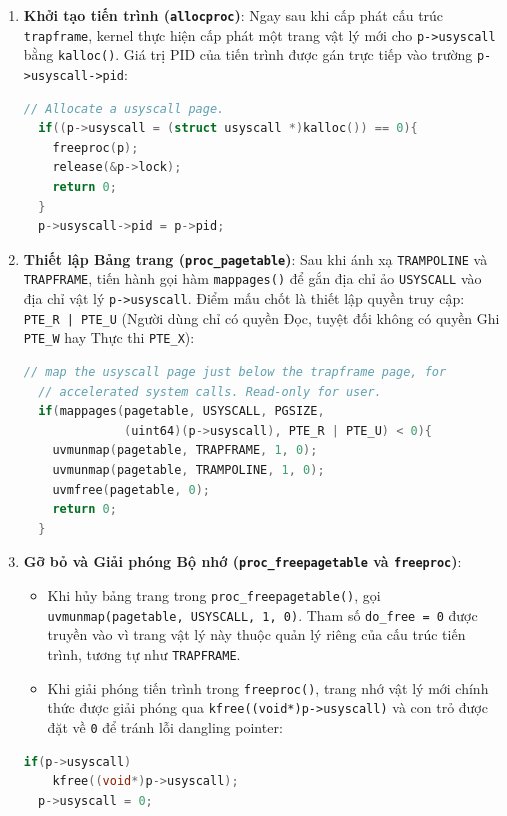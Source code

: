 \begin{enumerate}
    \item \textbf{Khởi tạo tiến trình (\texttt{allocproc})}: Ngay sau khi cấp phát cấu trúc \texttt{trapframe}, kernel thực hiện cấp phát một trang vật lý mới cho \texttt{p->usyscall} bằng \texttt{kalloc()}. Giá trị PID của tiến trình được gán trực tiếp vào trường \texttt{p->usyscall->pid}:
\begin{lstlisting}[language=C, caption={Cấp phát trang usyscall trong allocproc()}]
  // Allocate a usyscall page.
  if((p->usyscall = (struct usyscall *)kalloc()) == 0){
    freeproc(p);
    release(&p->lock);
    return 0;
  }
  p->usyscall->pid = p->pid;
\end{lstlisting}

    \item \textbf{Thiết lập Bảng trang (\texttt{proc\_pagetable})}: Sau khi ánh xạ \texttt{TRAMPOLINE} và \texttt{TRAPFRAME}, tiến hành gọi hàm \texttt{mappages()} để gắn địa chỉ ảo \texttt{USYSCALL} vào địa chỉ vật lý \texttt{p->usyscall}. Điểm mấu chốt là thiết lập quyền truy cập: \texttt{PTE\_R | PTE\_U} (Người dùng chỉ có quyền Đọc, tuyệt đối không có quyền Ghi \texttt{PTE\_W} hay Thực thi \texttt{PTE\_X}):
\begin{lstlisting}[language=C, caption={Ánh xạ trang USYSCALL trong proc\_pagetable()}]
  // map the usyscall page just below the trapframe page, for
  // accelerated system calls. Read-only for user.
  if(mappages(pagetable, USYSCALL, PGSIZE,
              (uint64)(p->usyscall), PTE_R | PTE_U) < 0){
    uvmunmap(pagetable, TRAPFRAME, 1, 0);
    uvmunmap(pagetable, TRAMPOLINE, 1, 0);
    uvmfree(pagetable, 0);
    return 0;
  }
\end{lstlisting}

    \item \textbf{Gỡ bỏ và Giải phóng Bộ nhớ (\texttt{proc\_freepagetable} và \texttt{freeproc})}:
    \begin{itemize}
        \item Khi hủy bảng trang trong \texttt{proc\_freepagetable()}, gọi \texttt{uvmunmap(pagetable, USYSCALL, 1, 0)}. Tham số \texttt{do\_free = 0} được truyền vào vì trang vật lý này thuộc quản lý riêng của cấu trúc tiến trình, tương tự như \texttt{TRAPFRAME}.
        \item Khi giải phóng tiến trình trong \texttt{freeproc()}, trang nhớ vật lý mới chính thức được giải phóng qua \texttt{kfree((void*)p->usyscall)} và con trỏ được đặt về \texttt{0} để tránh lỗi dangling pointer:
    \end{itemize}
\begin{lstlisting}[language=C, caption={Thu hồi trang usyscall trong freeproc()}]
  if(p->usyscall)
    kfree((void*)p->usyscall);
  p->usyscall = 0;
\end{lstlisting}
\end{enumerate}

